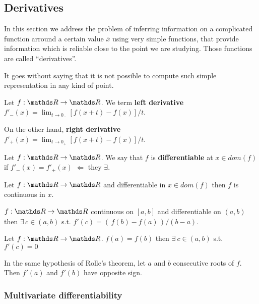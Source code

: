 \documentclass[computationalMathematics.tex]{subfiles}
\begin{document}
\subsection{Derivatives}

In this section we address the problem of inferring information on a complicated function arround a certain value $\bar{x}$ using very simple functions, that provide information which is reliable close to the point we are studying.
Those functions are called ``derivatives''.

It goes without saying that it is not possible to compute such simple representation in any kind of point.

\begin{definition}
  Let $f: \R \to \R$. We term \textbf{left derivative} $f'_{-}(x) = \lim_{t \to 0_{-}} [f(x + t) - f(x)] / t$.
  
  On the other hand, \textbf{right derivative} $f'_{+}(x) = \lim_{t \to 0_{+}} [f(x + t) - f(x)] / t$.
\end{definition}

\begin{definition}[Differentiable]
  Let $f:\R \to \R$. We say that $f$ is \textbf{differentiable} at $x \in dom(f)$ if $f'_-(x) = f'_+(x)$ $\Leftarrow$ they $\exists$.
\end{definition}

\begin{proposition}
  Let $f: \R \to \R$ and differentiable in $x \in dom(f)$ then $f$ is continuous in $x$. 
\end{proposition}


\begin{theorem}
$f : \R \to \R$ continuous on $[a, b]$ and differentiable on $(a,b)$ then $\exists \, c \in (a, b)$ s.t. $f'(c) = ( \, f(b) - f(a) \, ) / (b - a)$.
\end{theorem}

\begin{theorem}
Let $f: \R \to \R$. $f(a) = f(b)$ then $\exists~c \in (a, b)$ s.t.~$f'(c) = 0$
\end{theorem}

\begin{corollary}
In the same hypothesis of Rolle's theorem, let $a$ and $b$ consecutive roots of $f$. Then $f'(a)$ and $f'(b)$ have opposite sign.
\end{corollary}

\subsubsection{Multivariate differentiability}
\end{document}
